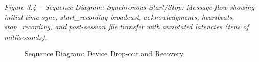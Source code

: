 \documentclass[12pt,a4paper]{article}
\begin{document}
\emph{Figure 3.4 -- Sequence Diagram: Synchronous Start/Stop: Message flow showing initial time sync, start\_recording broadcast, acknowledgments, heartbeats, stop\_recording, and post-session file transfer with annotated latencies (tens of milliseconds).}

\begin{figure}
\centering
{}
\caption{Sequence Diagram: Device Drop-out and Recovery}
\end{figure}
\end{document}
